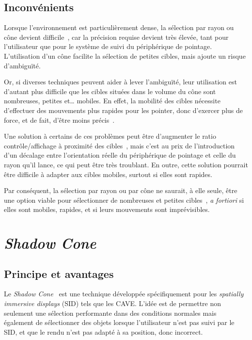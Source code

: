 	\subsection{Inconvénients}
	Lorsque l'environnement est particulièrement dense, la sélection par rayon ou cône devient difficile~\cite{kopper2011rapid}, car la précision requise devient très élevée, tant pour l'utilisateur que pour le système de suivi du périphérique de pointage. L'utilisation d'un cône facilite la sélection de petites cibles, mais ajoute un risque d'ambiguïté.
	
	Or, si diverses techniques peuvent aider à lever l'ambiguïté, leur utilisation est d'autant plus difficile que les cibles situées dans le volume du cône sont nombreuses, petites et\ldots{} mobiles. En effet, la mobilité des cibles nécessite d'effectuer des mouvements plus rapides pour les pointer, donc d'exercer plus de force, et de fait, d'être moins précis~\cite{schmidt1979motor}.
	
	Une solution à certains de ces problèmes peut être d'augmenter le ratio contrôle/affichage à proximité des cibles~\cite{frees2007prism, kopper2010human}, mais c'est au prix de l'introduction d'un décalage entre l'orientation réelle du périphérique de pointage et celle du rayon qu'il lance, ce qui peut être très troublant. En outre, cette solution pourrait être difficile à adapter aux cibles mobiles, surtout si elles sont rapides.
	
	Par conséquent, la sélection par rayon ou par cône ne saurait, à elle seule, être une option viable pour sélectionner de nombreuses et petites cibles~\cite{steed20043d}, \emph{a fortiori} si elles sont mobiles, rapides, et si leurs mouvements sont imprévisibles.
	
\section{\emph{Shadow Cone}}
	\subsection{Principe et avantages}
	Le \emph{Shadow Cone}~\cite{steed20043d} est une technique développée spécifiquement pour les \emph{spatially immersive displays} (SID) tels que les CAVE. L'idée est de permettre non seulement une sélection performante dans des conditions \og normales \fg{} mais également de sélectionner des objets lorsque l'utilisateur n'est pas suivi par le SID, et que le rendu n'est pas adapté à sa position, donc incorrect.
	
